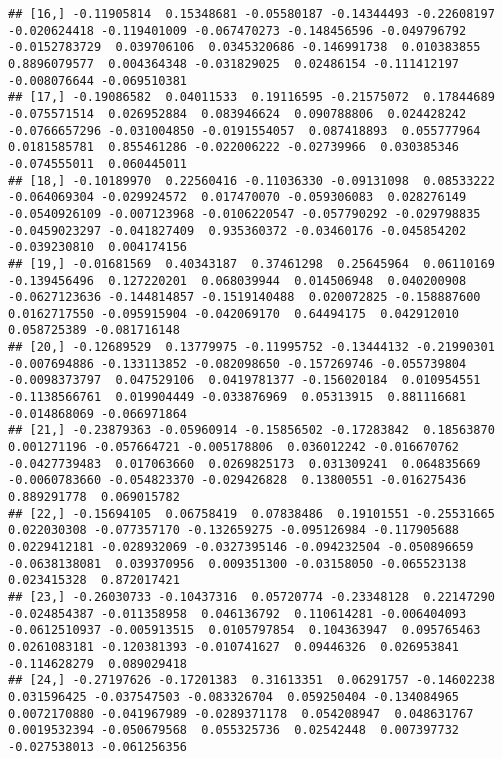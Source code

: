 \documentclass[
]{book}
\begin{document}
\begin{verbatim}
## [16,] -0.11905814  0.15348681 -0.05580187 -0.14344493 -0.22608197 -0.020624418 -0.119401009 -0.067470273 -0.148456596 -0.049796792 -0.0152783729  0.039706106  0.0345320686 -0.146991738  0.010383855  0.8896079577  0.004364348 -0.031829025  0.02486154 -0.111412197 -0.008076644 -0.069510381
## [17,] -0.19086582  0.04011533  0.19116595 -0.21575072  0.17844689 -0.075571514  0.026952884  0.083946624  0.090788806  0.024428242 -0.0766657296 -0.031004850 -0.0191554057  0.087418893  0.055777964  0.0181585781  0.855461286 -0.022006222 -0.02739966  0.030385346 -0.074555011  0.060445011
## [18,] -0.10189970  0.22560416 -0.11036330 -0.09131098  0.08533222 -0.064069304 -0.029924572  0.017470070 -0.059306083  0.028276149 -0.0540926109 -0.007123968 -0.0106220547 -0.057790292 -0.029798835 -0.0459023297 -0.041827409  0.935360372 -0.03460176 -0.045854202 -0.039230810  0.004174156
## [19,] -0.01681569  0.40343187  0.37461298  0.25645964  0.06110169 -0.139456496  0.127220201  0.068039944  0.014506948  0.040200908 -0.0627123636 -0.144814857 -0.1519140488  0.020072825 -0.158887600  0.0162717550 -0.095915904 -0.042069170  0.64494175  0.042912010  0.058725389 -0.081716148
## [20,] -0.12689529  0.13779975 -0.11995752 -0.13444132 -0.21990301 -0.007694886 -0.133113852 -0.082098650 -0.157269746 -0.055739804 -0.0098373797  0.047529106  0.0419781377 -0.156020184  0.010954551 -0.1138566761  0.019904449 -0.033876969  0.05313915  0.881116681 -0.014868069 -0.066971864
## [21,] -0.23879363 -0.05960914 -0.15856502 -0.17283842  0.18563870  0.001271196 -0.057664721 -0.005178806  0.036012242 -0.016670762 -0.0427739483  0.017063660  0.0269825173  0.031309241  0.064835669 -0.0060783660 -0.054823370 -0.029426828  0.13800551 -0.016275436  0.889291778  0.069015782
## [22,] -0.15694105  0.06758419  0.07838486  0.19101551 -0.25531665  0.022030308 -0.077357170 -0.132659275 -0.095126984 -0.117905688  0.0229412181 -0.028932069 -0.0327395146 -0.094232504 -0.050896659 -0.0638138081  0.039370956  0.009351300 -0.03158050 -0.065523138  0.023415328  0.872017421
## [23,] -0.26030733 -0.10437316  0.05720774 -0.23348128  0.22147290 -0.024854387 -0.011358958  0.046136792  0.110614281 -0.006404093 -0.0612510937 -0.005913515  0.0105797854  0.104363947  0.095765463  0.0261083181 -0.120381393 -0.010741627  0.09446326  0.026953841 -0.114628279  0.089029418
## [24,] -0.27197626 -0.17201383  0.31613351  0.06291757 -0.14602238  0.031596425 -0.037547503 -0.083326704  0.059250404 -0.134084965  0.0072170880 -0.041967989 -0.0289371178  0.054208947  0.048631767  0.0019532394 -0.050679568  0.055325736  0.02542448  0.007397732 -0.027538013 -0.061256356

\end{verbatim}
\end{document}
